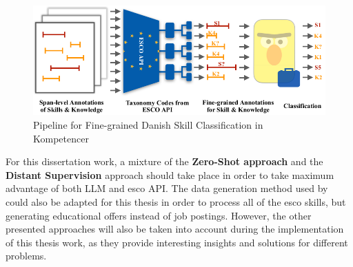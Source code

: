 \begin{figure}[H]
    \centering
    \includegraphics[width=15cm]{figs/kompetencer.png}
    \caption{Pipeline for Fine-grained Danish Skill Classification in Kompetencer~\cite{zhang2022kompetencer}}
    \label{fig:kompetencer}
\end{figure}



For this dissertation work, a mixture of the \textbf{Zero-Shot approach} and the \textbf{Distant Supervision} approach should take place in order to take maximum advantage of both LLM and \ac{esco} API. The data generation method used by~\citeauthor{clavié2023large}~\cite{clavié2023large} could also be adapted for this thesis in order to process all of the \ac{esco} skills, but generating educational offers instead of job postings. However, the other presented approaches will also be taken into account during the implementation of this thesis work, as they provide interesting insights and solutions for different problems.
